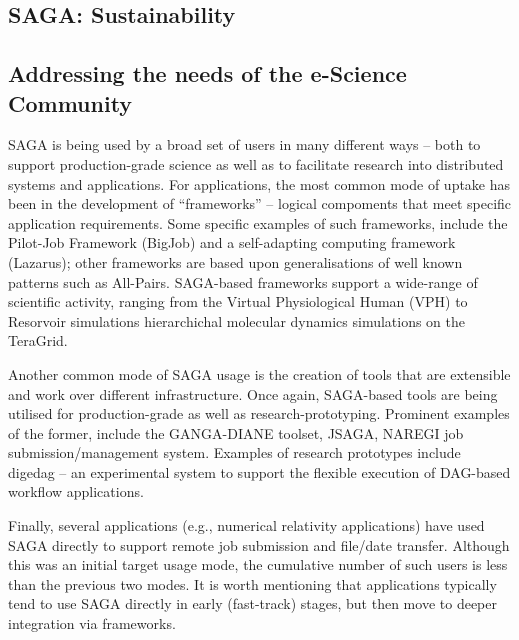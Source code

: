 \documentclass[a4paper,10pt]{article}
\newcommand{\note}[1]{ {\textcolor{red} { ***NOTE: #1 }}}
\newcommand{\jhanote}[1]{  {\textcolor{red}     { ***Shantenu: #1 }}}
\newcommand{\jhanote}[1]{}
\begin{document}
\subsection*{SAGA: Sustainability}
\vspace{-0.5em}
\subsection*{Addressing the needs of the e-Science Community}

SAGA is being used by a broad set of users in many different ways --
both to support production-grade science as well as to facilitate
research into distributed systems and applications.  For applications,
the most common mode of uptake has been in the development of
``frameworks'' -- logical compoments that meet specific application
requirements. Some specific examples of such frameworks, include the
Pilot-Job Framework (BigJob) and a self-adapting computing framework
(Lazarus); other frameworks are based upon generalisations of well
known patterns such as All-Pairs. SAGA-based frameworks support a
wide-range of scientific activity, ranging from the Virtual
Physiological Human (VPH) to Resorvoir simulations hierarchichal
molecular dynamics simulations on the TeraGrid.

Another common mode of SAGA usage is the creation of tools that are
extensible and work over different infrastructure. Once again,
SAGA-based tools are being utilised for production-grade as well as
research-prototyping. Prominent examples of the former, include the
GANGA-DIANE toolset, JSAGA, NAREGI job submission/management
system. Examples of research prototypes include digedag -- an
experimental system to support the flexible execution of DAG-based
workflow applications.

Finally, several applications (e.g., numerical relativity
applications) have used SAGA directly to support remote job submission
and file/date transfer. Although this was an initial target usage
mode, the cumulative number of such users is less than the previous
two modes. It is worth mentioning that applications typically tend to
use SAGA directly in early (fast-track) stages, but then move to
deeper integration via frameworks.
\vspace{-0.8em}
\pagebreak
\end{document}
